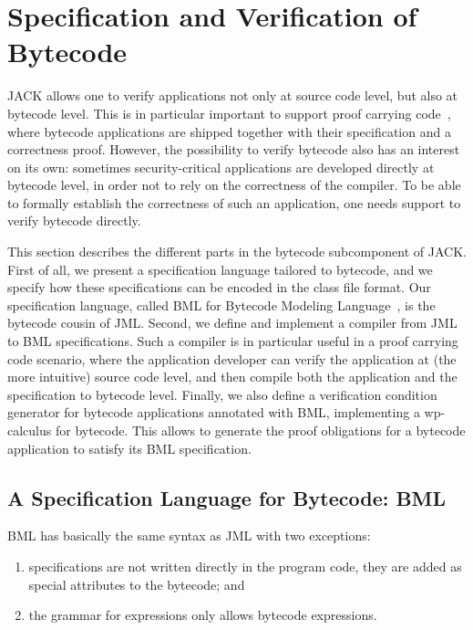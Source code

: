 
\section{Specification and Verification of Bytecode}\label{SecBytecode}

JACK allows one to verify applications not only at source code level,
but also at bytecode level. This is in particular important to support
proof carrying code~\cite{Necula97}, where bytecode applications are
shipped together with their specification and a correctness
proof. However, the possibility to verify bytecode also has an
interest on its own: sometimes security-critical applications are
developed directly at bytecode level, in order not to rely on the
correctness of the compiler. To be able to formally establish the
correctness of such an application, one needs support to verify
bytecode directly.

This section describes the different parts in the bytecode
subcomponent of JACK. First of all, we present a specification
language tailored to bytecode, and we specify how these specifications
can be encoded in the class file format. Our specification language,
called BML for Bytecode Modeling Language~\cite{BurdyHP07}, is the
bytecode cousin of JML. Second, we define and implement a compiler
from JML to BML specifications. Such a compiler is in particular
useful in a proof carrying code scenario, where the application
developer can verify the application at (the more intuitive) source
code level, and then compile both the application and the
specification to bytecode level. Finally, we also define a
verification condition generator for bytecode applications annotated
with BML, implementing a wp-calculus for bytecode. This allows to
generate the proof obligations for a bytecode application to satisfy
its BML specification.

\subsection{A Specification Language for Bytecode: BML}

BML has basically the same syntax as JML with two exceptions:
\begin{enumerate}
\item specifications are not written directly in the program code,
they are added as special attributes to the bytecode; and
\item the grammar for expressions only allows bytecode expressions.
\end{enumerate}

